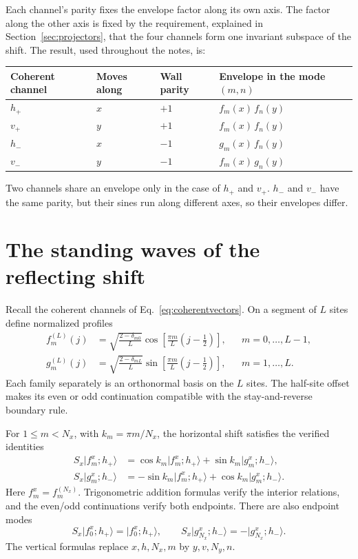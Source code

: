 \documentclass[11pt,a4paper,oneside]{report}
\newcommand{\ket}[1]{\lvert #1\rangle}
\numberwithin{equation}{chapter}
\begin{document}
Each channel's parity fixes the envelope factor along its own axis. The
factor along the other axis is fixed by the requirement, explained in
Section~\ref{sec:projectors}, that the four channels form one invariant
subspace of the shift. The result, used throughout the notes, is:
\begin{center}
\begin{tabular}{@{}llll@{}}\toprule
Coherent channel & Moves along & Wall parity & Envelope in the mode \((m,n)\)\\\midrule
\(h_+\) & \(x\) & \(+1\) & \(f_m(x)\,f_n(y)\)\\
\(v_+\) & \(y\) & \(+1\) & \(f_m(x)\,f_n(y)\)\\
\(h_-\) & \(x\) & \(-1\) & \(g_m(x)\,f_n(y)\)\\
\(v_-\) & \(y\) & \(-1\) & \(f_m(x)\,g_n(y)\)\\\bottomrule
\end{tabular}
\end{center}
Two channels share an envelope only in the case of \(h_+\) and \(v_+\).
\(h_-\) and \(v_-\) have the same parity, but their sines run along
different axes, so their envelopes differ.

\section{The standing waves of the reflecting shift}
\label{sec:standing}

Recall the coherent channels of Eq.~\eqref{eq:coherentvectors}.
On a segment of \(L\) sites define normalized profiles
\begin{align}
f_m^{(L)}(j)&=\sqrt{\frac{2-\delta_{m0}}{L}}
\cos\!\left[\frac{\pi m}{L}(j-\tfrac12)\right],
&&m=0,\ldots,L-1,\label{eq:fgdef}\\
g_m^{(L)}(j)&=\sqrt{\frac{2-\delta_{mL}}{L}}
\sin\!\left[\frac{\pi m}{L}(j-\tfrac12)\right],
&&m=1,\ldots,L.
\end{align}
Each family separately is an orthonormal basis on the \(L\) sites.
The half-site offset makes its even or odd continuation compatible
with the stay-and-reverse boundary rule.

For \(1\leq m<N_x\), with \(k_m=\pi m/N_x\), the horizontal
shift satisfies the verified identities
\begin{align}
S_x\ket{f_m^x;h_+}
&=\cos k_m\ket{f_m^x;h_+}+\sin k_m\ket{g_m^x;h_-},\\
S_x\ket{g_m^x;h_-}
&=-\sin k_m\ket{f_m^x;h_+}+\cos k_m\ket{g_m^x;h_-}.
\label{eq:moderotation}
\end{align}
Here \(f_m^x=f_m^{(N_x)}\). Trigonometric addition formulas verify
the interior relations, and the even/odd continuations verify both
endpoints. There are also endpoint modes
\begin{equation}
S_x\ket{f_0^x;h_+}=\ket{f_0^x;h_+},\qquad
S_x\ket{g_{N_x}^x;h_-}=-\ket{g_{N_x}^x;h_-}.
\end{equation}
The vertical formulas replace \(x,h,N_x,m\) by \(y,v,N_y,n\).
\end{document}
